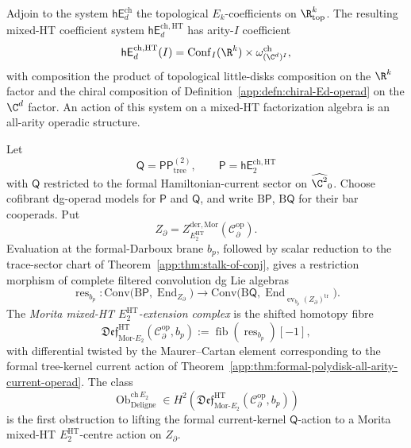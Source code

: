 \begin{constr}\label{app:constr:hEd-HT}
Adjoin to the system $\mathsf{hE}_d^{\mathrm{ch}}$ the
topological \(E_k\)-coefficients on $\R^k_{\mathrm{top}}$.  The
resulting mixed-HT coefficient system
\(\mathsf{hE}_d^{\mathrm{ch},\mathrm{HT}}\) has arity-\(I\)
coefficient
\[
  \mathsf{hE}_d^{\mathrm{ch},\mathrm{HT}}(I)
   =\mathrm{Conf}_I(\R^k)\times
   \omega^{\mathrm{ch}}_{(\C^d)^I},
\]
with composition the product of topological little-disks
composition on the $\R^k$ factor and the chiral composition of
Definition~\ref{app:defn:chiral-Ed-operad} on the $\C^d$ factor.  An
action of this system on a mixed-HT factorization algebra is an
all-arity operadic structure.
\end{constr}

\begin{defn}
\label{app:defn:morita-chiral-E2-extension-complex}
Let
\[
  \mathsf Q=\mathsf{PP}^{(2)}_{\mathrm{tree}},
  \qquad
  \mathsf P=\mathsf{hE}_2^{\mathrm{ch},\mathrm{HT}}
\]
with \(\mathsf Q\) restricted to the formal Hamiltonian-current sector on
\(\widehat{\C^2}_0\).  Choose cofibrant dg-operad models for
\(\mathsf P\) and \(\mathsf Q\), and write
\(\mathrm B\mathsf P\), \(\mathrm B\mathsf Q\) for their bar
cooperads.  Put
\[
  Z_\partial
  =
  Z^{\mathrm{der},\mathrm{Mor}}_{E_2^{\mathrm{HT}}}
    (\mathcal C^{\mathrm{op}}_\partial).
\]
Evaluation at the formal-Darboux brane \(b_p\), followed by scalar
reduction to the trace-sector chart of
Theorem~\ref{app:thm:stalk-of-conj}, gives a restriction morphism of
complete filtered convolution dg Lie algebras
\[
  \operatorname{res}_{b_p}\colon
  \mathrm{Conv}\bigl(\mathrm B\mathsf P,\operatorname{End}_{Z_\partial}\bigr)
  \longrightarrow
  \mathrm{Conv}\bigl(\mathrm B\mathsf Q,
      \operatorname{End}_{\operatorname{ev}_{b_p}(Z_\partial)^{\mathrm{tr}}}
      \bigr).
\]
The \emph{Morita mixed-HT \(E_2^{\mathrm{HT}}\)-extension complex} is the shifted
homotopy fibre
\[
  \mathfrak{Def}^{\mathrm{HT}}_{\mathrm{Mor}\mbox{-}E_2}
    (\mathcal C^{\mathrm{op}}_\partial,b_p)
  :=
  \operatorname{fib}(\operatorname{res}_{b_p})[-1],
\]
with differential twisted by the Maurer--Cartan element corresponding to
the formal tree-kernel current action of
Theorem~\ref{app:thm:formal-polydisk-all-arity-current-operad}.
The class
\[
  \operatorname{Ob}^{\mathrm{ch}\,E_2}_{\mathrm{Deligne}}
  \in
  H^2\!\left(
    \mathfrak{Def}^{\mathrm{HT}}_{\mathrm{Mor}\mbox{-}E_2}
    (\mathcal C^{\mathrm{op}}_\partial,b_p)
  \right)
\]
is the first obstruction to lifting the formal current-kernel
\(\mathsf Q\)-action to a Morita mixed-HT \(E_2^{\mathrm{HT}}\)-centre action on
\(Z_\partial\).
\end{defn}

